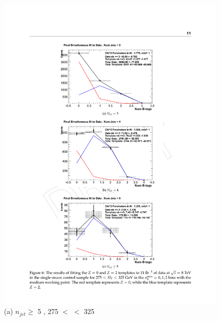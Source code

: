 \begin{figure}[ht]
\centering
\begin{minipage}[b]{0.48 \linewidth}
\includegraphics[width = 1.0\linewidth]{plots/template_data_medium_njet5_lowht.pdf}
\centering (a) $n_{jet} \geq$  5 , 275 $<$ \theht $<$ 325
\end{minipage}
\quad
\begin{minipage}[b]{0.48\linewidth}

\end{minipage}
\end{figure}
